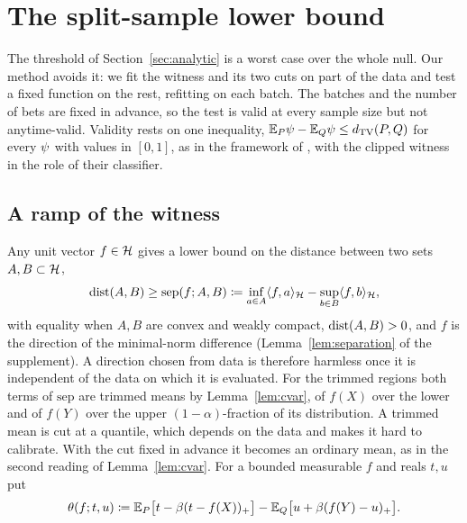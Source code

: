 \section{The split-sample lower bound}
\label{sec:split}

The threshold of Section~\ref{sec:analytic} is a worst case over the whole null. Our method avoids it: we fit the
witness and its two cuts on part of the data and test a fixed function on the rest, refitting on each batch. The
batches and the number of bets are fixed in advance, so the test is valid at every sample size but not anytime-valid.
Validity rests on one inequality, $\mathbb{E}_P\psi-\mathbb{E}_Q\psi\le d_{\mathrm{TV}}(P,Q)$ for every $\psi$ with values in $[0,1]$, as in the
framework of \citet{naf2022hplb}, with the clipped witness in the role of their classifier.

\subsection{A ramp of the witness}
\label{sec:ramp}

Any unit vector $f\in\mathcal{H}$ gives a lower bound on the distance between two sets $A,B\subset\mathcal{H}$,
\[
\operatorname{dist}(A,B)\ge\mathrm{sep}(f;A,B)\coloneqq\inf_{a\in A}\langle f,a\rangle_{\mathcal{H}}-\sup_{b\in B}\langle f,b\rangle_{\mathcal{H}} ,
\]
with equality when $A,B$ are convex and weakly compact, $\operatorname{dist}(A,B)>0$, and $f$ is the direction of the minimal-norm
difference (Lemma~\ref{lem:separation} of the supplement). A direction chosen from data is therefore harmless once it
is independent of the data on which it is evaluated. For the trimmed regions both terms of $\mathrm{sep}$ are trimmed
means by Lemma~\ref{lem:cvar}, of $f(X)$ over the lower and of $f(Y)$ over the upper $(1-\alpha)$-fraction of its
distribution. A trimmed mean is cut at a quantile, which depends on the data and makes it hard to calibrate. With the cut fixed in advance it becomes an ordinary mean, as in the second reading of Lemma~\ref{lem:cvar}. For a bounded
measurable $f$ and reals $t,u$ put
\[
\theta(f;t,u)\coloneqq\mathbb{E}_P\big[t-\beta(t-f(X))_+\big]-\mathbb{E}_Q\big[u+\beta(f(Y)-u)_+\big].
\]

